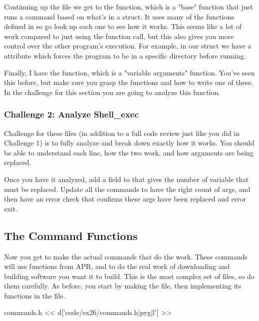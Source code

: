 Continuing up the file we get to the  function, which is
a "base" function that just runs a command based on what's in a 
struct.  It uses many of the functions defined in 
so go look up each one to see how it works.  This seems like a lot of work
compared to just using the  function call, but this also gives
you more control over the other program's execution.  For example, in our
 struct we have a  attribute which forces the program
to be in a specific directory before running.

Finally, I have the  function, which is a "variable arguments"
function.  You've seen this before, but make sure you grasp the 
functions and how to write one of these.  In the challenge for this section
you are going to analyze this function.

\subsubsection{Challenge 2: Analyze Shell\_exec}

Challenge for these files (in addition to a full code review just like you
did in Challenge 1) is to fully analyze  and break down
exactly how it works.  You should be able to understand each line, how
the two  work, and how arguments are being replaced.

Once you have it analyzed, add a field to  that gives
the number of variable  that must be replaced.  Update all the
commands to have the right count of args, and then have an error check that
confirms these args have been replaced and error exit.

\subsection{The Command Functions}

Now you get to make the actual commands that do the work.  These commands
will use functions from APR,  and  to do the 
real work of downloading and building software you want it to build.
This is the most complex set of files, so do them carefully.  As before, you
start by making the  file, then implementing its functions
in the  file.

\begin{code}{commands.h}
<< d['code/ex26/commands.h|pyg|l'] >>
\end{code}

